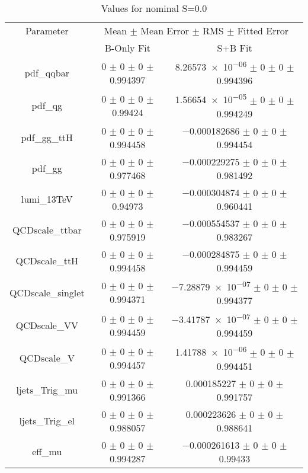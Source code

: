 \begin{table}
\centering
\caption{Values for nominal S=0.0}
\begin{tabular}{ccc}
\toprule
Parameter 	& \multicolumn{2}{c}{Mean $\pm$ Mean Error $\pm$ RMS $\pm$ Fitted Error}\\
 	& B-Only Fit & S+B Fit\\
\midrule
pdf\_qqbar 	& \num{0} $\pm$ \num{0} $\pm$ \num{0} $\pm$ \num{0.994397} 	& \num{8.26573e-06} $\pm$ \num{0} $\pm$ \num{0} $\pm$ \num{0.994396}\\
pdf\_qg 	& \num{0} $\pm$ \num{0} $\pm$ \num{0} $\pm$ \num{0.99424} 	& \num{1.56654e-05} $\pm$ \num{0} $\pm$ \num{0} $\pm$ \num{0.994249}\\
pdf\_gg\_ttH 	& \num{0} $\pm$ \num{0} $\pm$ \num{0} $\pm$ \num{0.994458} 	& \num{-0.000182686} $\pm$ \num{0} $\pm$ \num{0} $\pm$ \num{0.994454}\\
pdf\_gg 	& \num{0} $\pm$ \num{0} $\pm$ \num{0} $\pm$ \num{0.977468} 	& \num{-0.000229275} $\pm$ \num{0} $\pm$ \num{0} $\pm$ \num{0.981492}\\
lumi\_13TeV 	& \num{0} $\pm$ \num{0} $\pm$ \num{0} $\pm$ \num{0.94973} 	& \num{-0.000304874} $\pm$ \num{0} $\pm$ \num{0} $\pm$ \num{0.960441}\\
QCDscale\_ttbar 	& \num{0} $\pm$ \num{0} $\pm$ \num{0} $\pm$ \num{0.975919} 	& \num{-0.000554537} $\pm$ \num{0} $\pm$ \num{0} $\pm$ \num{0.983267}\\
QCDscale\_ttH 	& \num{0} $\pm$ \num{0} $\pm$ \num{0} $\pm$ \num{0.994458} 	& \num{-0.000284875} $\pm$ \num{0} $\pm$ \num{0} $\pm$ \num{0.994459}\\
QCDscale\_singlet 	& \num{0} $\pm$ \num{0} $\pm$ \num{0} $\pm$ \num{0.994371} 	& \num{-7.28879e-07} $\pm$ \num{0} $\pm$ \num{0} $\pm$ \num{0.994377}\\
QCDscale\_VV 	& \num{0} $\pm$ \num{0} $\pm$ \num{0} $\pm$ \num{0.994459} 	& \num{-3.41787e-07} $\pm$ \num{0} $\pm$ \num{0} $\pm$ \num{0.994459}\\
QCDscale\_V 	& \num{0} $\pm$ \num{0} $\pm$ \num{0} $\pm$ \num{0.994457} 	& \num{1.41788e-06} $\pm$ \num{0} $\pm$ \num{0} $\pm$ \num{0.994451}\\
ljets\_Trig\_mu 	& \num{0} $\pm$ \num{0} $\pm$ \num{0} $\pm$ \num{0.991366} 	& \num{0.000185227} $\pm$ \num{0} $\pm$ \num{0} $\pm$ \num{0.991757}\\
ljets\_Trig\_el 	& \num{0} $\pm$ \num{0} $\pm$ \num{0} $\pm$ \num{0.988057} 	& \num{0.000223626} $\pm$ \num{0} $\pm$ \num{0} $\pm$ \num{0.988641}\\
eff\_mu 	& \num{0} $\pm$ \num{0} $\pm$ \num{0} $\pm$ \num{0.994287} 	& \num{-0.000261613} $\pm$ \num{0} $\pm$ \num{0} $\pm$ \num{0.99433}\\

\end{tabular}
\end{table}
